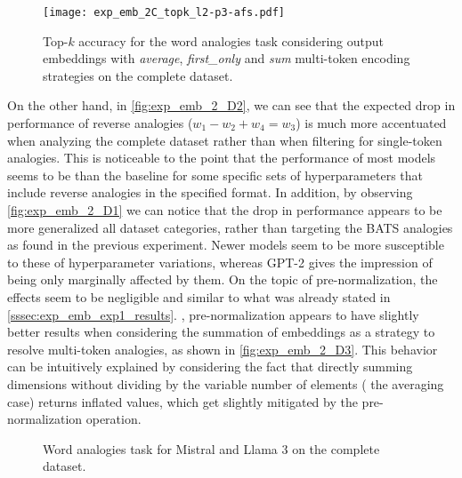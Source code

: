 \begin{figure}[t!]
    \centering
    \texttt{[image: exp\_emb\_2C\_topk\_l2-p3-afs.pdf]}
    \caption{Top-$k$ accuracy for the word analogies task considering output embeddings with \emph{average}, \emph{first\_only} and \emph{sum} multi-token encoding strategies on the complete dataset.}
    \label{fig:exp_emb_2_C}
\end{figure}

On the other hand, in \cref{fig:exp_emb_2_D2}, we can see that the expected drop in performance of reverse analogies ($w_1 - w_2 + w_4 = w_3$) is much more accentuated when analyzing the complete dataset rather than when filtering for single-token analogies.
This is noticeable to the point that the performance of most models seems to be  than the baseline for some specific sets of hyperparameters that include reverse analogies in the specified format.
In addition, by observing \cref{fig:exp_emb_2_D1} we can notice that the drop in performance appears to be more generalized  all dataset categories, rather than targeting the BATS analogies as found in the previous experiment.
Newer models seem to be more susceptible to these  of hyperparameter variations, whereas GPT-2 gives the impression of being only marginally affected by them.
On the topic of pre-normalization, the effects seem to be negligible and similar to what was already stated in \cref{sssec:exp_emb_exp1_results}.
, pre-normalization appears to have slightly better results when considering the summation of embeddings as a strategy to resolve multi-token analogies, as shown in \cref{fig:exp_emb_2_D3}.
This behavior can be intuitively explained by considering the fact that directly summing dimensions without dividing by the variable number of elements ( the averaging case) returns inflated values, which get slightly mitigated by the pre-normalization operation.

\begin{figure}[t!]
    \centering
    \quad
    \begingroup
    \captionsetup{width=0.9\textwidth/2}
    \endgroup
    \caption{Word analogies task for Mistral and Llama 3 on the complete dataset.}
    \label{fig:exp_emb_2_D}
\end{figure}

